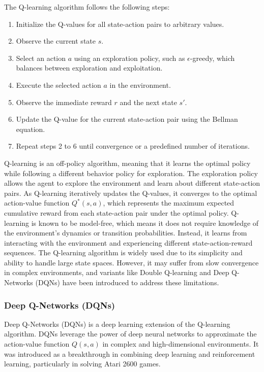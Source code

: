 The Q-learning algorithm follows the following steps:
\begin{enumerate}
    \item Initialize the Q-values for all state-action pairs to arbitrary values.
    \item Observe the current state \(s\).
    \item Select an action \(a\) using an exploration policy, such as \(\epsilon\)-greedy, which balances between exploration and exploitation.
    \item Execute the selected action \(a\) in the environment.
    \item Observe the immediate reward \(r\) and the next state \(s'\).
    \item Update the Q-value for the current state-action pair using the Bellman equation.
    \item Repeat steps 2 to 6 until convergence or a predefined number of iterations.
\end{enumerate}
Q-learning is an off-policy algorithm, meaning that it learns the optimal policy while following a different behavior policy for exploration. The exploration policy allows the agent to explore the environment and learn about different state-action pairs.
As Q-learning iteratively updates the Q-values, it converges to the optimal action-value function \(Q^*(s, a)\), which represents the maximum expected cumulative reward from each state-action pair under the optimal policy.
Q-learning is known to be model-free, which means it does not require knowledge of the environment's dynamics or transition probabilities. Instead, it learns from interacting with the environment and experiencing different state-action-reward sequences.
The Q-learning algorithm is widely used due to its simplicity and ability to handle large state spaces. However, it may suffer from slow convergence in complex environments, and variants like Double Q-learning and Deep Q-Networks (DQNs) have been introduced to address these limitations.

\subsubsection{Deep Q-Networks (DQNs)}
Deep Q-Networks (DQNs) is a deep learning extension of the Q-learning algorithm. DQNs leverage the power of deep neural networks to approximate the action-value function \(Q(s, a)\) in complex and high-dimensional environments. It was introduced as a breakthrough in combining deep learning and reinforcement learning, particularly in solving Atari 2600 games.

